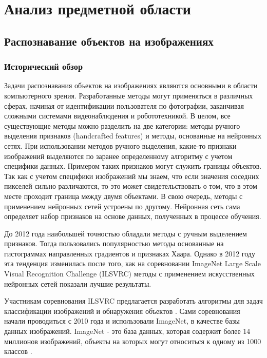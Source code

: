 \section{Анализ предметной области}

\subsection{Распознавание объектов на изображениях}

\subsubsection{Исторический обзор}
Задачи распознавания объектов на изображениях являются основными в области компьютерного зрения.
Разработанные методы могут применяться в различных сферах, начиная от идентификации пользователя по фотографии, 
заканчивая сложными системами видеонаблюдения и робототехникой. В целом, все существующие методы можно разделить на 
две категории: методы ручного выделения признаков (handcrafted features) и методы, основанные на нейронных сетях.
При использовании методов ручного выделения, какие-то признаки изображений выделяются по заранее определенному алгоритму 
с учетом специфики данных. Примером таких признаков могут служить границы объектов. Так как с учетом специфики изображений 
мы знаем, что если значения соседних пикселей сильно различаются, то это может свидетельствовать о том, что в этом
месте проходит граница между двумя объектами. В свою очередь, методы с применением нейронных сетей устроены по другому. 
Нейронная сеть сама определяет набор признаков на основе данных, полученных в процессе обучения.

До 2012 года наибольшей точностью обладали методы с ручным выделением признаков. Тогда пользовались
популярностью методы основанные на гистограммах направленных градиентов и признаках Хаара. Однако в 2012 году эта 
тенденция изменилась после того, как на соревновании ImageNet Large Scale Visual Recognition Challenge (ILSVRC) 
методы с применением искусственных нейронных сетей показали лучшие результаты.

Участникам соревнования ILSVRC предлагается разработать алгоритмы для задач классификации изображений и обнаружения
объектов \cite{ILSVRC}. Сами соревнования начали проводиться с 2010 года и использовали ImageNet, в качестве базы данных 
изображений. ImageNet - это база данных, которая содержит более 14 миллионов изображений, объекты на которых могут 
относиться к одному из 1000 классов \cite{IMAGE_NET}. 

